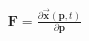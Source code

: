 \documentclass[preview]{standalone}
\begin{document}
\begin{align*}
\mathbf{F} = \frac{\partial \vec{\mathbf{x}}(\mathbf{p}, t)}{\partial \mathbf{p}}
\end{align*}
\end{document}
